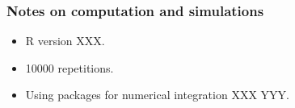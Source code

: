 \documentclass[12pt]{article}
\begin{document}
\subsubsection*{Notes on computation and simulations}
\begin{itemize}
\item R version XXX.
\item 10000 repetitions.
\item Using packages for numerical integration XXX YYY.
\end{itemize}
%
%


\end{document}

